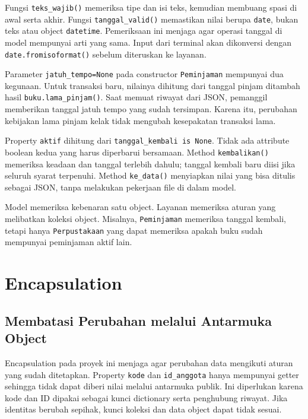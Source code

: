 Fungsi \texttt{teks\_wajib()} memeriksa tipe dan isi teks, kemudian membuang spasi di awal serta akhir. Fungsi \texttt{tanggal\_valid()} memastikan nilai berupa \texttt{date}, bukan teks atau object \texttt{datetime}. Pemeriksaan ini menjaga agar operasi tanggal di model mempunyai arti yang sama. Input dari terminal akan dikonversi dengan \texttt{date.fromisoformat()} sebelum diteruskan ke layanan.

Parameter \texttt{jatuh\_tempo=None} pada constructor \texttt{Peminjaman} mempunyai dua kegunaan. Untuk transaksi baru, nilainya dihitung dari tanggal pinjam ditambah hasil \texttt{buku.lama\_pinjam()}. Saat memuat riwayat dari JSON, pemanggil memberikan tanggal jatuh tempo yang sudah tersimpan. Karena itu, perubahan kebijakan lama pinjam kelak tidak mengubah kesepakatan transaksi lama.

Property \texttt{aktif} dihitung dari \texttt{tanggal\_kembali is None}. Tidak ada attribute boolean kedua yang harus diperbarui bersamaan. Method \texttt{kembalikan()} memeriksa keadaan dan tanggal terlebih dahulu; tanggal kembali baru diisi jika seluruh syarat terpenuhi. Method \texttt{ke\_data()} menyiapkan nilai yang bisa ditulis sebagai JSON, tanpa melakukan pekerjaan file di dalam model.

\begin{tips}
Model memeriksa kebenaran satu object. Layanan memeriksa aturan yang melibatkan koleksi object. Misalnya, \texttt{Peminjaman} memeriksa tanggal kembali, tetapi hanya \texttt{Perpustakaan} yang dapat memeriksa apakah buku sudah mempunyai peminjaman aktif lain.
\end{tips}

\section{Encapsulation}

\subsection{Membatasi Perubahan melalui Antarmuka Object}

Encapsulation pada proyek ini menjaga agar perubahan data mengikuti aturan yang sudah ditetapkan. Property \texttt{kode} dan \texttt{id\_anggota} hanya mempunyai getter sehingga tidak dapat diberi nilai melalui antarmuka publik. Ini diperlukan karena kode dan ID dipakai sebagai kunci dictionary serta penghubung riwayat. Jika identitas berubah sepihak, kunci koleksi dan data object dapat tidak sesuai.

